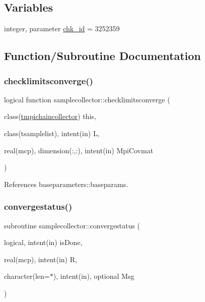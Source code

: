 \subsection*{Variables}
\begin{DoxyCompactItemize}
\item 
integer, parameter \mbox{\hyperlink{namespacesamplecollector_a029f9e194c92603bd4274671b736f565}{chk\+\_\+id}} = 3252359
\end{DoxyCompactItemize}


\subsection{Function/\+Subroutine Documentation}
\mbox{\label{namespacesamplecollector_aa4decfd3d422ec7bc2ca897a53e155c1}} 
\subsubsection{\texorpdfstring{checklimitsconverge()}{checklimitsconverge()}}
{\footnotesize\ttfamily logical function samplecollector\+::checklimitsconverge (\begin{DoxyParamCaption}\item[{class(\mbox{\hyperlink{structsamplecollector_1_1tmpichaincollector}{tmpichaincollector}})}]{this,  }\item[{class(tsamplelist), intent(in)}]{L,  }\item[{real(mcp), dimension(\+:,\+:), intent(in)}]{Mpi\+Covmat }\end{DoxyParamCaption})\hspace{0.3cm}{\ttfamily [private]}}



References baseparameters\+::baseparams.

\mbox{\label{namespacesamplecollector_aedac586422a605cbd11d9c0892242684}} 
\subsubsection{\texorpdfstring{convergestatus()}{convergestatus()}}
{\footnotesize\ttfamily subroutine samplecollector\+::convergestatus (\begin{DoxyParamCaption}\item[{logical, intent(in)}]{is\+Done,  }\item[{real(mcp), intent(in)}]{R,  }\item[{character(len=$\ast$), intent(in), optional}]{Msg }\end{DoxyParamCaption})\hspace{0.3cm}{\ttfamily [private]}}



